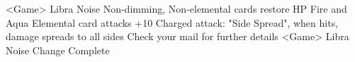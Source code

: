 <Game> Libra Noise 
Non-dimming, Non-elemental cards restore HP 
Fire and Aqua Elemental card attacks +10 
Charged attack: "Side Spread", when hits, damage spreads to all sides 
Check your mail for further details 
<Game> Libra Noise Change Complete 
